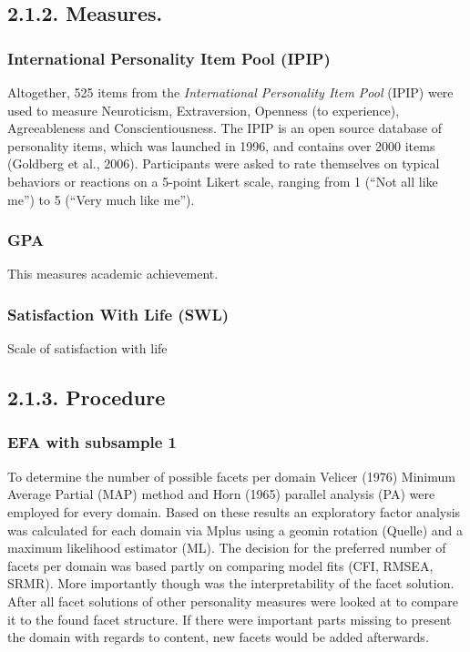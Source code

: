 \documentclass[man]{apa6}
\theoremstyle{definition}
\theoremstyle{definition}
\theoremstyle{definition}
\theoremstyle{remark}
\begin{document}
\hypertarget{measures.}{%
\subsection{2.1.2. Measures.}\label{measures.}}

\hypertarget{international-personality-item-pool-ipip}{%
\subsubsection{International Personality Item Pool
(IPIP)}\label{international-personality-item-pool-ipip}}

Altogether, 525 items from the \emph{International Personality Item
Pool} (IPIP) were used to measure Neuroticism, Extraversion, Openness
(to experience), Agreeableness and Conscientiousness. The IPIP is an
open source database of personality items, which was launched in 1996,
and contains over 2000 items (Goldberg et al., 2006). Participants were
asked to rate themselves on typical behaviors or reactions on a 5-point
Likert scale, ranging from 1 (\enquote{Not all like me}) to 5
(\enquote{Very much like me}).

\hypertarget{gpa}{%
\subsubsection{GPA}\label{gpa}}

This measures academic achievement.

\hypertarget{satisfaction-with-life-swl}{%
\subsubsection{Satisfaction With Life
(SWL)}\label{satisfaction-with-life-swl}}

Scale of satisfaction with life

\hypertarget{procedure}{%
\subsection{2.1.3. Procedure}\label{procedure}}

\hypertarget{efa-with-subsample-1}{%
\subsubsection{EFA with subsample 1}\label{efa-with-subsample-1}}

To determine the number of possible facets per domain Velicer (1976)
Minimum Average Partial (MAP) method and Horn (1965) parallel analysis
(PA) were employed for every domain. Based on these results an
exploratory factor analysis was calculated for each domain via Mplus
using a geomin rotation (Quelle) and a maximum likelihood estimator
(ML). The decision for the preferred number of facets per domain was
based partly on comparing model fits (CFI, RMSEA, SRMR). More
importantly though was the interpretability of the facet solution. After
all facet solutions of other personality measures were looked at to
compare it to the found facet structure. If there were important parts
missing to present the domain with regards to content, new facets would
be added afterwards.
\end{document}
